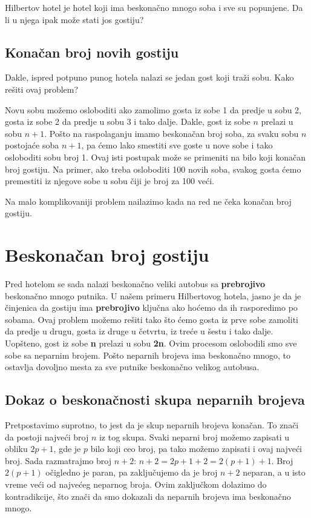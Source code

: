 \documentclass[a4paper]{article}
\begin{document}
Hilbertov hotel je hotel koji ima beskonačno mnogo soba i sve su popunjene. Da li u njega ipak može stati jos gostiju?

\subsection{Konačan broj novih gostiju}
Dakle, ispred potpuno punog hotela nalazi se jedan gost koji traži sobu. Kako rešiti ovaj problem?

Novu sobu možemo osloboditi ako zamolimo gosta iz sobe 1 da predje u sobu 2, gosta iz sobe 2 da predje u sobu 3 i tako dalje. Dakle, gost iz sobe $n$ prelazi u sobu $n+1$.
Pošto na raspolaganju imamo beskonačan broj soba, za svaku sobu $n$ postojaće soba $n+1$, pa ćemo lako smestiti sve goste u nove sobe i tako osloboditi sobu broj 1.
Ovaj isti postupak može se primeniti na bilo koji konačan broj gostiju. Na primer, ako treba osloboditi 100 novih soba, svakog gosta ćemo premestiti iz njegove sobe u sobu čiji je broj za 100 veći.

Na malo komplikovaniji problem nailazimo kada na red ne čeka konačan broj gostiju.\\

\section{Beskonačan broj gostiju}
\label{poglavlje:beskonačan broj gostiju}
Pred hotelom se sada nalazi beskonačno veliki autobus sa \textbf {prebrojivo} beskonačno mnogo putnika.
U našem primeru Hilbertovog hotela, jasno je da je činjenica da gostiju ima \textbf {prebrojivo} ključna ako hoćemo da ih rasporedimo po sobama.
Ovaj problem možemo rešiti tako što ćemo gosta iz prve sobe zamoliti da predje u drugu, gosta iz druge u četvrtu, iz treće u šestu i tako dalje.
Uopšteno, gost iz sobe \textbf{n} prelazi u sobu \textbf{2n}. Ovim procesom oslobodili smo sve sobe sa neparnim brojem.
Pošto neparnih brojeva ima beskonačno mnogo, to ostavlja dovoljno mesta za sve putnike beskonačno velikog autobusa.

\subsection {Dokaz o beskonačnosti skupa neparnih brojeva}
Pretpostavimo suprotno, to jest da je skup neparnih brojeva konačan.
To znači da postoji najveći broj $n$ iz tog skupa.
Svaki neparni broj možemo zapisati u obliku $2p+1$, gde je $p$ bilo koji ceo broj, pa tako možemo zapisati i ovaj najveći broj.
Sada razmatrajmo broj $n+2$: $n+2=2p+1+2=2(p+1)+1$.
Broj $2(p+1)$ očigledno je paran, pa zaključujemo da je broj $n+2$ neparan, a u isto vreme veći od najvećeg neparnog broja.
Ovim zaključkom dolazimo do kontradikcije, što znači da smo dokazali da neparnih brojeva ima beskonačno mnogo.
\end{document}
